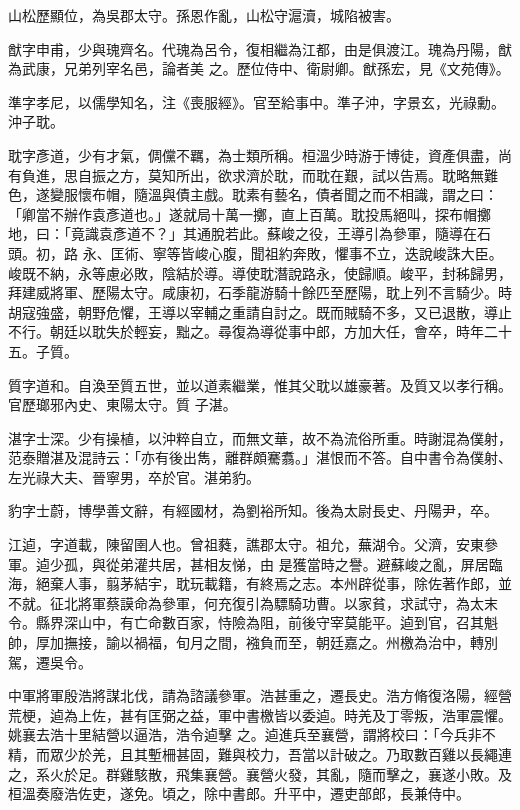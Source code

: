 \begin{pinyinscope}
 山松歷顯位，為吳郡太守。孫恩作亂，山松守滬瀆，城陷被害。



 猷字申甫，少與瑰齊名。代瑰為呂令，復相繼為江都，由是俱渡江。瑰為丹陽，猷為武康，兄弟列宰名邑，論者美
 之。歷位侍中、衛尉卿。猷孫宏，見《文苑傳》。



 準字孝尼，以儒學知名，注《喪服經》。官至給事中。準子沖，字景玄，光祿勳。沖子耽。



 耽字彥道，少有才氣，倜儻不羈，為士類所稱。桓溫少時游于博徒，資產俱盡，尚有負進，思自振之方，莫知所出，欲求濟於耽，而耽在艱，試以告焉。耽略無難色，遂變服懷布帽，隨溫與債主戲。耽素有藝名，債者聞之而不相識，謂之曰：「卿當不辦作袁彥道也。」遂就局十萬一擲，直上百萬。耽投馬絕叫，探布帽擲地，曰：「竟識袁彥道不？」其通脫若此。蘇峻之役，王導引為參軍，隨導在石頭。初，路
 永、匡術、寧等皆峻心腹，聞祖約奔敗，懼事不立，迭說峻誅大臣。峻既不納，永等慮必敗，陰結於導。導使耽潛說路永，使歸順。峻平，封秭歸男，拜建威將軍、歷陽太守。咸康初，石季龍游騎十餘匹至歷陽，耽上列不言騎少。時胡寇強盛，朝野危懼，王導以宰輔之重請自討之。既而賊騎不多，又已退散，導止不行。朝廷以耽失於輕妄，黜之。尋復為導從事中郎，方加大任，會卒，時年二十五。子質。



 質字道和。自渙至質五世，並以道素繼業，惟其父耽以雄豪著。及質又以孝行稱。官歷瑯邪內史、東陽太守。質
 子湛。



 湛字士深。少有操植，以沖粹自立，而無文華，故不為流俗所重。時謝混為僕射，范泰贈湛及混詩云：「亦有後出雋，離群頗騫翥。」湛恨而不答。自中書令為僕射、左光祿大夫、晉寧男，卒於官。湛弟豹。



 豹字士蔚，博學善文辭，有經國材，為劉裕所知。後為太尉長史、丹陽尹，卒。



 江逌，字道載，陳留圉人也。曾祖蕤，譙郡太守。祖允，蕪湖令。父濟，安東參軍。逌少孤，與從弟灌共居，甚相友悌，由
 是獲當時之譽。避蘇峻之亂，屏居臨海，絕棄人事，翦茅結宇，耽玩載籍，有終焉之志。本州辟從事，除佐著作郎，並不就。征北將軍蔡謨命為參軍，何充復引為驃騎功曹。以家貧，求試守，為太末令。縣界深山中，有亡命數百家，恃險為阻，前後守宰莫能平。逌到官，召其魁帥，厚加撫接，諭以禍福，旬月之間，襁負而至，朝廷嘉之。州檄為治中，轉別駕，遷吳令。



 中軍將軍殷浩將謀北伐，請為諮議參軍。浩甚重之，遷長史。浩方脩復洛陽，經營荒梗，逌為上佐，甚有匡弼之益，軍中書檄皆以委逌。時羌及丁零叛，浩軍震懼。姚襄去浩十里結營以逼浩，浩令逌擊
 之。逌進兵至襄營，謂將校曰：「今兵非不精，而眾少於羌，且其塹柵甚固，難與校力，吾當以計破之。乃取數百雞以長繩連之，系火於足。群雞駭散，飛集襄營。襄營火發，其亂，隨而擊之，襄遂小敗。及桓溫奏廢浩佐吏，遂免。頃之，除中書郎。升平中，遷吏部郎，長兼侍中。




\end{pinyinscope}
